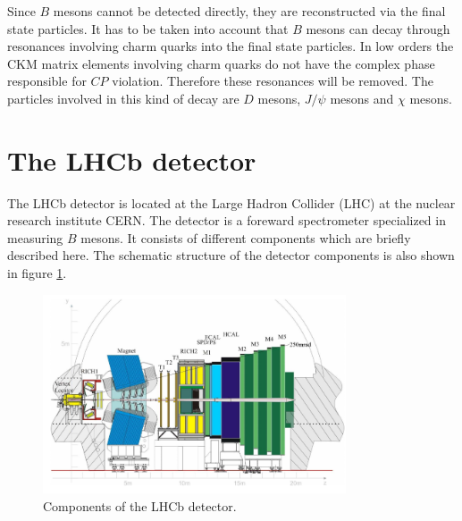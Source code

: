 Since $B$ mesons cannot be detected directly, they are reconstructed via the final state particles.
It has to be taken into account that $B$ mesons can decay through resonances involving charm quarks into the final state particles.
In low orders the CKM matrix elements involving charm quarks do not have the complex phase responsible for $C\!P$ violation.
Therefore these resonances will be removed.
The particles involved in this kind of decay are $D$ mesons, $J/\psi$ mesons and $\chi$ mesons.

\section{The LHCb detector}
The LHCb detector \cite{lhcb} is located at the Large Hadron Collider (LHC) at the nuclear research institute CERN.
The detector is a foreward spectrometer specialized in measuring $B$ mesons.
It consists of different components which are briefly described here.
The schematic structure of the detector components is also shown in figure \ref{fig:lhcb}.

\begin{figure}[!htb]
  \centering
  \includegraphics[width=0.8\textwidth]{graphics/lhcb.png}
  \caption{Components of the LHCb detector. \cite{lhcb}}
  \label{fig:lhcb}
\end{figure}

